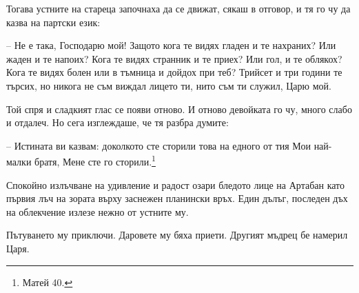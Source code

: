 Тогава устните на стареца започнаха да се движат, сякаш в отговор, и тя го чу да
казва на партски език:

-- Не е така, Господарю мой! Защото кога те видях гладен и те нахраних? Или
жаден и те напоих? Кога те видях странник и те приех? Или гол, и те облякох?
Кога те видях болен или в тъмница и дойдох при теб? Трийсет и три години те
търсих, но никога не съм виждал лицето ти, нито съм ти служил, Царю мой.

Той спря и сладкият глас се появи отново. И отново девойката го чу, много слабо
и отдалеч. Но сега изглеждаше, че тя разбра думите:

-- Истината ви казвам: доколкото сте сторили това на едного от тия Мои най-малки
братя, Мене сте го сторили.\footnote{Матей 40.}

Спокойно излъчване на удивление и радост озари бледото лице на Артабан като
първия лъч на зората върху заснежен планински връх. Един дълъг, последен дъх на
облекчение излезе нежно от устните му.

Пътуването му приключи. Даровете му бяха приети. Другият мъдрец бе намерил Царя.
